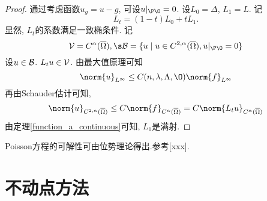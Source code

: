 \begin{proof}
    通过考虑函数$u_g=u-g$, 可设$u|_{\P \O}=0$. 设$L_0=\Delta$, $L_1=L$. 记
    \begin{equation}
        L_t=(1-t)L_0+tL_1.
    \end{equation}
    显然, $L_t$的系数满足一致椭条件. 记
    \begin{equation}
        \V= C^\alpha(\OC), \s \B=\{u \mid u \in \ctwoa(\OC), u|_{\P \O}=0\}
    \end{equation}
    设$u \in \mathcal{B}$. $L_tu \in \mathcal{V}$. 由最大值原理可知
    \begin{equation}
        \norm{u}_{L^\infty} \le C(n,\lambda,\Lambda,\O)\norm{f}_{L^\infty}
    \end{equation}
    再由Schauder估计可知,
    \begin{equation}
        \norm{u}_{\ctwoa(\OC)} \le C\norm{f}_{C^\alpha(\OC)} = C\norm{L_tu}_{C^\alpha(\OC)}
    \end{equation}
    由定理\eqref{function_a_continuous}可知, $L_1$是满射. 
\end{proof}
\begin{remark}
    Poisson方程的可解性可由位势理论得出.参考[xxx].
\end{remark}
\section{不动点方法}